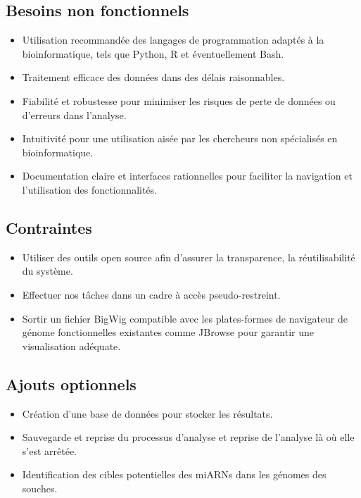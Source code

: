 \documentclass{report}
\begin{document}
\subsection{Besoins non fonctionnels}
\begin{itemize}
    \item Utilisation recommandée des langages de programmation adaptés à la bioinformatique, tels que Python, R et éventuellement Bash.
    \item Traitement efficace des données dans des délais raisonnables.
    \item Fiabilité et robustesse pour minimiser les risques de perte de données ou d'erreurs dans l'analyse.
    \item Intuitivité pour une utilisation aisée par les chercheurs non spécialisés en bioinformatique.
    \item Documentation claire et interfaces rationnelles pour faciliter la navigation et l'utilisation des fonctionnalités.
\end{itemize}

\subsection{Contraintes}
\begin{itemize}
    \item Utiliser des outils open source afin d'assurer la transparence, la réutilisabilité du système.
    \item Effectuer nos tâches dans un cadre à accès pseudo-restreint.
    \item Sortir un fichier BigWig compatible avec les plates-formes de navigateur de génome fonctionnelles existantes comme JBrowse pour garantir une visualisation adéquate.
\end{itemize}

\subsection{Ajouts optionnels}
\begin{itemize}
    \item Création d'une base de données pour stocker les résultats.
    \item Sauvegarde et reprise du processus d'analyse et reprise de l'analyse là où elle s'est arrêtée.
    \item Identification des cibles potentielles des miARNs dans les génomes des souches.
\end{itemize}
\end{document}
